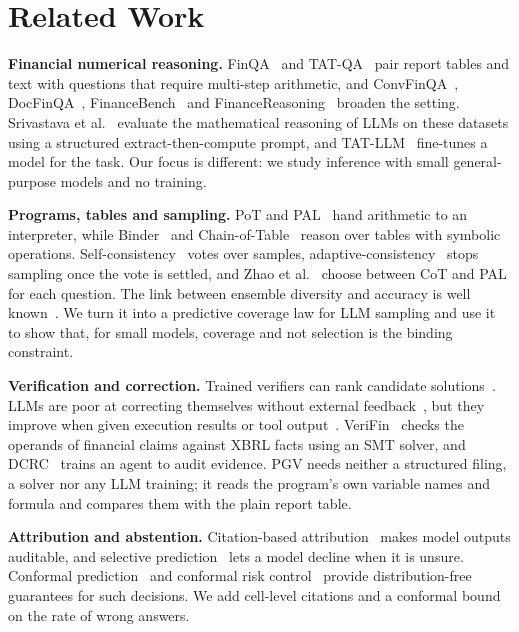 \documentclass[conference]{IEEEtran}
\begin{document}
\section{Related Work}
\textbf{Financial numerical reasoning.} FinQA~\cite{finqa} and TAT-QA~\cite{tatqa} pair report tables and text with questions that require multi-step arithmetic, and ConvFinQA~\cite{convfinqa}, DocFinQA~\cite{docfinqa}, FinanceBench~\cite{financebench} and FinanceReasoning~\cite{finreasoning} broaden the setting. Srivastava et al.~\cite{eedp} evaluate the mathematical reasoning of LLMs on these datasets using a structured extract-then-compute prompt, and TAT-LLM~\cite{tatllm} fine-tunes a model for the task. Our focus is different: we study inference with small general-purpose models and no training.

\textbf{Programs, tables and sampling.} PoT and PAL~\cite{pot,pal} hand arithmetic to an interpreter, while Binder~\cite{binder} and Chain-of-Table~\cite{chainoftable} reason over tables with symbolic operations. Self-consistency~\cite{sc} votes over samples, adaptive-consistency~\cite{adaptiveconsistency} stops sampling once the vote is settled, and Zhao et al.~\cite{modelselection} choose between CoT and PAL for each question. The link between ensemble diversity and accuracy is well known~\cite{kuncheva}. We turn it into a predictive coverage law for LLM sampling and use it to show that, for small models, coverage and not selection is the binding constraint.

\textbf{Verification and correction.} Trained verifiers can rank candidate solutions~\cite{verifiers,lever}. LLMs are poor at correcting themselves without external feedback~\cite{cannotselfcorrect}, but they improve when given execution results or tool output~\cite{selfdebug,critic,selfrefine}. VeriFin~\cite{verifin} checks the operands of financial claims against XBRL facts using an SMT solver, and DCRC~\cite{dcrc} trains an agent to audit evidence. PGV needs neither a structured filing, a solver nor any LLM training; it reads the program's own variable names and formula and compares them with the plain report table.

\textbf{Attribution and abstention.} Citation-based attribution~\cite{alce} makes model outputs auditable, and selective prediction~\cite{selective,selectiveqa} lets a model decline when it is unsure. Conformal prediction~\cite{vovk} and conformal risk control~\cite{crc} provide distribution-free guarantees for such decisions. We add cell-level citations and a conformal bound on the rate of wrong answers.
\end{document}
